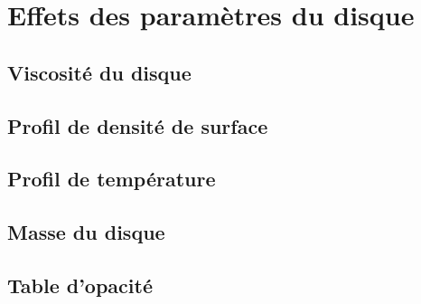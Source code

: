 \section{Effets des paramètres du disque}
\subsection{Viscosité du disque}
\subsection{Profil de densité de surface}
\subsection{Profil de température}
\subsection{Masse du disque}
\subsection{Table d'opacité}
